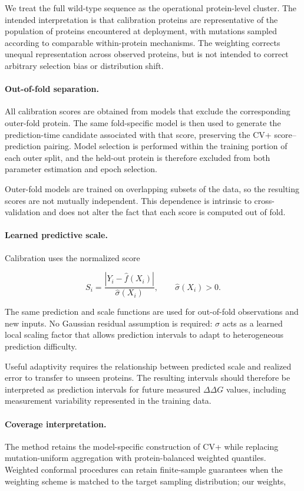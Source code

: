 \documentclass[11pt]{article}
\begin{document}
We treat the full wild-type sequence as the operational protein-level cluster. The intended interpretation is that calibration proteins are representative of the population of proteins encountered at deployment, with mutations sampled according to comparable within-protein mechanisms. The weighting corrects unequal representation across observed proteins, but is not intended to correct arbitrary selection bias or distribution shift.

\paragraph{Out-of-fold separation.}
All calibration scores are obtained from models that exclude the corresponding outer-fold protein. The same fold-specific model is then used to generate the prediction-time candidate associated with that score, preserving the CV+ score--prediction pairing. Model selection is performed within the training portion of each outer split, and the held-out protein is therefore excluded from both parameter estimation and epoch selection.

Outer-fold models are trained on overlapping subsets of the data, so the resulting scores are not mutually independent. This dependence is intrinsic to cross-validation and does not alter the fact that each score is computed out of fold.

\paragraph{Learned predictive scale.}
Calibration uses the normalized score

$$
S_i
=
\frac{
\left|Y_i-\widehat f(X_i)\right|
}{
\widehat\sigma(X_i)
},
\qquad
\widehat\sigma(X_i)>0.
$$

The same prediction and scale functions are used for out-of-fold observations and new inputs. No Gaussian residual assumption is required: \(\widehat\sigma\) acts as a learned local scaling factor that allows prediction intervals to adapt to heterogeneous prediction difficulty.

Useful adaptivity requires the relationship between predicted scale and realized error to transfer to unseen proteins. The resulting intervals should therefore be interpreted as prediction intervals for future measured \(\Delta\Delta G\) values, including measurement variability represented in the training data.

\paragraph{Coverage interpretation.}
The method retains the model-specific construction of CV+ while replacing mutation-uniform aggregation with protein-balanced weighted quantiles. Weighted conformal procedures can retain finite-sample guarantees when the weighting scheme is matched to the target sampling distribution; our weights,
\end{document}
